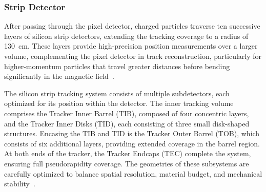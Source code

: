 



\subsubsection{Strip Detector}


After passing through the pixel detector, charged particles traverse ten successive layers of silicon strip detectors, extending the tracking coverage to a radius of 130~cm. These layers provide high-precision position measurements over a larger volume, complementing the pixel detector in track reconstruction, particularly for higher-momentum particles that travel greater distances before bending significantly in the magnetic field~\cite{Chatrchyan:1667597}. 

The silicon strip tracking system consists of multiple subdetectors, each optimized for its position within the detector. The inner tracking volume comprises the Tracker Inner Barrel (TIB), composed of four concentric layers, and the Tracker Inner Disks (TID), each consisting of three small disk-shaped structures. Encasing the TIB and TID is the Tracker Outer Barrel (TOB), which consists of six additional layers, providing extended coverage in the barrel region. At both ends of the tracker, the Tracker Endcaps (TEC) complete the system, ensuring full pseudorapidity coverage. The geometries of these subsystems are carefully optimized to balance spatial resolution, material budget, and mechanical stability~\cite{CMS:trackerTDR}. 

